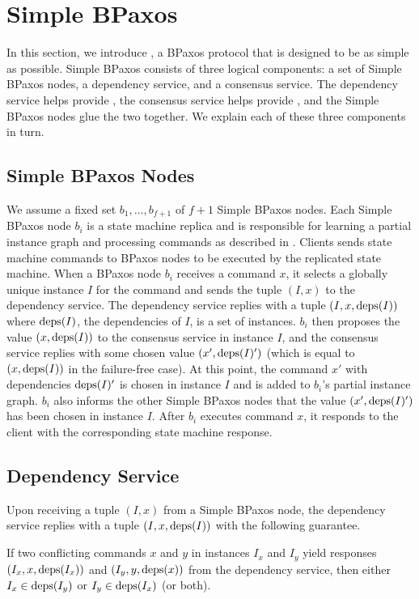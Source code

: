 \section{Simple BPaxos}
In this section, we introduce , a BPaxos protocol that
is designed to be as simple as possible.
%
Simple BPaxos consists of three logical components: a set of Simple BPaxos
nodes, a dependency service, and a consensus service. The dependency service
helps provide , the consensus service helps provide
, and the Simple BPaxos nodes glue the two together.
We explain each of these three components in turn.

\subsection{Simple BPaxos Nodes}
We assume a fixed set $b_1, \ldots, b_{f+1}$ of $f + 1$ Simple BPaxos nodes.
Each Simple BPaxos node $b_i$ is a state machine replica and is responsible for
learning a partial instance graph and processing commands as described in
.
%
Clients sends state machine commands to BPaxos nodes to be executed by the
replicated state machine. When a BPaxos node $b_i$ receives a command $x$, it
selects a globally unique instance $I$ for the command and sends the tuple $(I,
x)$ to the dependency service. The dependency service replies with a tuple $(I,
x, \text{deps}(I))$ where $\text{deps}(I)$, the dependencies of $I$, is a set of instances.
%
$b_i$ then proposes the value $(x, \text{deps}(I))$ to the consensus service in
instance $I$, and the consensus service replies with some chosen value $(x',
\text{deps}(I)')$ (which is equal to $(x, \text{deps}(I))$ in the failure-free case). At
this point, the command $x'$ with dependencies $\text{deps}(I)'$ is chosen in instance
$I$ and is added to $b_i$'s partial instance graph. $b_i$ also informs the
other Simple BPaxos nodes that the value $(x', \text{deps}(I)')$ has been chosen in
instance $I$.
%
After $b_i$ executes command $x$, it responds to the client with the
corresponding state machine response.

\subsection{Dependency Service}
Upon receiving a tuple $(I, x)$ from a Simple BPaxos node, the dependency
service replies with a tuple $(I, x, \text{deps}(I))$ with the following guarantee.

\begin{invariant}
If two conflicting commands $x$ and $y$ in instances $I_x$ and $I_y$ yield
responses $(I_x, x, \text{deps}(I_x))$ and $(I_y, y, \text{deps}(x))$ from the dependency
service, then either $I_x \in \text{deps}(I_y)$ or $I_y \in \text{deps}(I_x)$ (or both).
\end{invariant}

